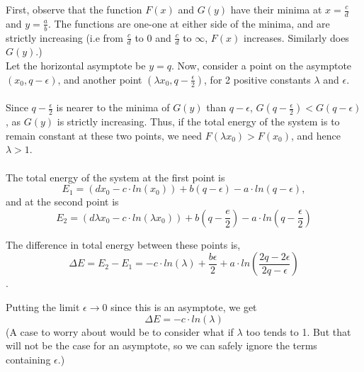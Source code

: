\documentclass{article}
\begin{document}
First, observe that the function $F(x)$ and $G(y)$ have their minima at $x = \frac{c}{d}$ and $y = \frac{a}{b}$. The functions are one-one at either side of the minima, and are strictly increasing (i.e from $\frac{c}{d}$ to 0 and $\frac{c}{d}$ to $\infty$, $F(x)$ increases. Similarly does $G(y)$.) 
\\
Let the horizontal asymptote be $y = q$. Now, consider a point on the asymptote $\left(x_0, q - \epsilon \right)$, and another point $\left(\lambda x_0, q - \frac{\epsilon}{2} \right)$, for 2 positive constants $\lambda$ and $\epsilon$. \\
\\
Since $q - \frac{\epsilon}{2}$ is nearer to the minima of $G(y)$ than $q - \epsilon$, $G(q - \frac{\epsilon}{2}) < G(q - \epsilon)$, as $G(y)$ is strictly increasing. Thus, if the total energy of the system is to remain constant at these two points, we need $F(\lambda x_0) > F(x_0)$, and hence $\lambda > 1$.
\\
\\
The total energy of the system at the first point is $$E_1 = (dx_0 - c\cdot ln(x_0)) + b(q - \epsilon) - a\cdot ln(q - \epsilon),$$
and at the second point is $$E_2 = (d\lambda x_0 - c\cdot ln(\lambda x_0)) + b\left (q - \frac{e}{2}\right ) - a\cdot ln\left (q - \frac{\epsilon}{2}\right )$$

The difference in total energy between these points is,
$$\Delta E = E_2 - E_1 = -c \cdot ln(\lambda) + \frac{b\epsilon}{2} + a\cdot ln(\frac{2q - 2\epsilon}{2q - \epsilon})$$.

Putting the limit $\epsilon \to 0$ since this is an asymptote, we get 
$$\Delta E = -c \cdot ln(\lambda)$$
(A case to worry about would be to consider what if $\lambda$ too tends to 1. But that will not be the case for an asymptote, so we can safely ignore the terms containing $\epsilon$.)
\end{document}
